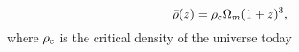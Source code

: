 \begin{equation}
\bar{\rho}(z) = \rho_{\rm{c}} \Omega_m (1 + z)^3,
\end{equation}
where $\rho_{\rm{c}}$ is the critical density of the universe today